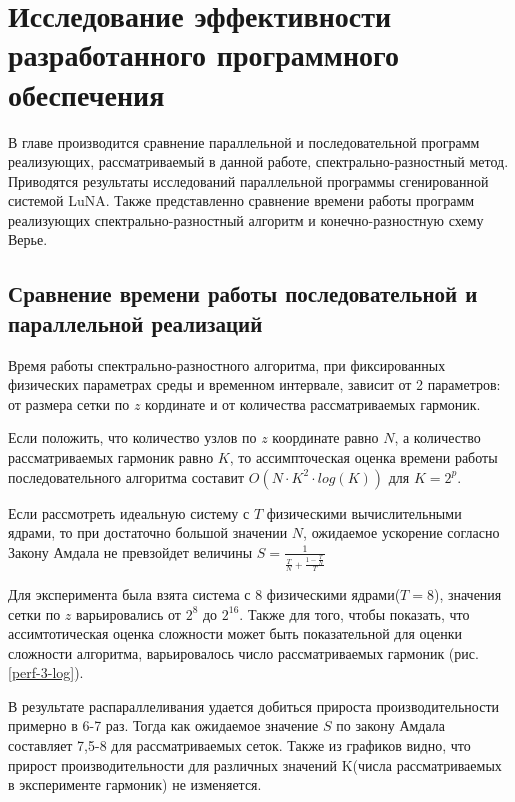 \section{Исследование эффективности разработанного программного обеспечения}

В главе производится сравнение параллельной и последовательной программ реализующих,
рассматриваемый в данной работе, спектрально-разностный метод.
Приводятся результаты исследований параллельной программы сгенированной системой LuNA.
Также представленно сравнение времени работы программ реализующих спектрально-разностный алгоритм
и конечно-разностную схему Верье.

\subsection{Сравнение времени работы последовательной и параллельной реализаций}

Время работы спектрально-разностного алгоритма, при фиксированных физических параметрах среды и временном интервале,
зависит от 2 параметров: от размера сетки по $z$ кординате и от количества рассматриваемых гармоник.

Если положить, что количество узлов по $z$ координате равно $N$, а количество рассматриваемых гармоник равно $K$,
то ассимпточеская оценка времени работы последовательного алгоритма составит $O(N\cdot K^2 \cdot log(K))$ для $K=2^p$.

Если рассмотреть идеальную систему с $T$ физическими вычислительными ядрами, то при достаточно большой значении $N$,
ожидаемое ускорение согласно Закону Амдала не превзойдет величины $S = \frac{1}{\frac{T}{N} + \frac{1-\frac{T}{N}}{T}}$

Для эксперимента была взята система с 8 физическими ядрами($T=8$), значения сетки по $z$ варьировались от $2^8$ до $2^{16}$.
Также для того, чтобы показать, что ассимтотическая оценка сложности может быть показательной для оценки сложности алгоритма,
варьировалось число рассматриваемых гармоник (рис. \ref{perf-3-log}).


В результате распараллеливания удается добиться прироста производительности примерно в 6-7 раз. Тогда как
ожидаемое значение $S$ по закону Амдала составляет 7,5-8 для рассматриваемых сеток. Также из графиков видно, что прирост
производительности для различных значений K(числа рассматриваемых в эксперименте гармоник) не изменяется.

